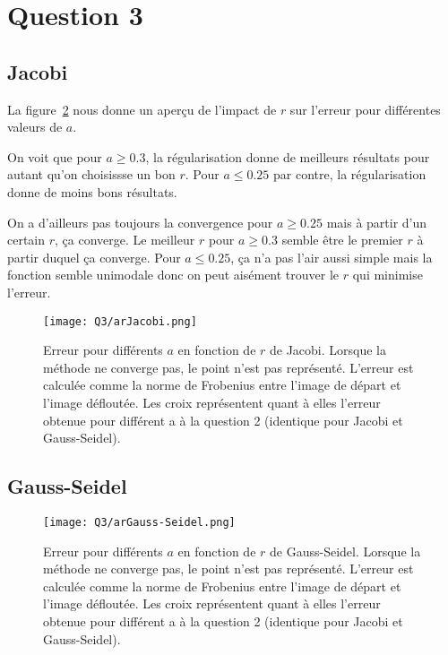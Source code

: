 \section{Question 3}

\subsection{Jacobi}
La figure~\ref{fig:ar} nous donne un aperçu de l'impact de $r$
sur l'erreur pour différentes valeurs de $a$.

On voit que pour $a \geq 0.3$, la régularisation donne de meilleurs résultats
pour autant qu'on choisissse un bon $r$.
Pour $a \leq 0.25$ par contre, la régularisation donne de moins bons résultats.

On a d'ailleurs pas toujours la convergence pour $a \geq 0.25$ mais à partir
d'un certain $r$, ça converge.
Le meilleur $r$ pour $a \geq 0.3$ semble être le premier $r$ à partir duquel
ça converge.
Pour $a \leq 0.25$, ça n'a pas l'air aussi simple mais la fonction semble
unimodale donc on peut aisément trouver le $r$ qui minimise l'erreur.

\begin{figure}
  \centering
  \texttt{[image: Q3/arJacobi.png]}
  \caption{Erreur pour différents $a$ en fonction de $r$ de Jacobi.
  Lorsque la méthode ne converge pas, le point n'est pas représenté.
  L'erreur est calculée comme la norme de Frobenius entre l'image de départ
  et l'image défloutée. Les croix représentent quant à elles l'erreur obtenue pour différent a à la question 2 (identique pour Jacobi et Gauss-Seidel).}
  \label{fig:ar}
\end{figure}

\subsection{Gauss-Seidel}

\begin{figure}
  \centering
  \texttt{[image: Q3/arGauss-Seidel.png]}
  \caption{Erreur pour différents $a$ en fonction de $r$ de Gauss-Seidel.
  Lorsque la méthode ne converge pas, le point n'est pas représenté.
  L'erreur est calculée comme la norme de Frobenius entre l'image de départ
  et l'image défloutée. Les croix représentent quant à elles l'erreur obtenue pour différent a à la question 2 (identique pour Jacobi et Gauss-Seidel).}
  \label{fig:ar}
\end{figure}

